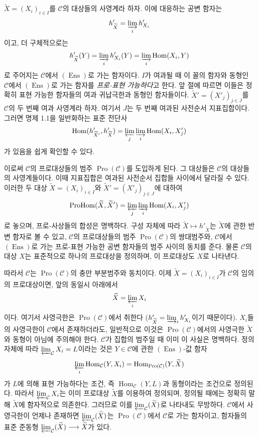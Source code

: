 $\widetilde X=(X_i)_{i\in I}$를 $\mathcal C$의 대상들의 사영계라 하자.
이에 대응하는 공변 함자는
\[
  h'_{\widetilde X}=\varinjlim_i h'_{X_i}
\]
이고, 더 구체적으로는
\[
  h'_{\widetilde X}(Y)=\varinjlim_i h'_{X_i}(Y)
  =\varinjlim_i\operatorname{Hom}(X_i,Y)
\]
로 주어지는 $\mathcal C$에서 $(\operatorname{Ens})$로 가는 함자이다.
$I$가 여과될 때 이 꼴의 함자와 동형인 $\mathcal C$에서
$(\operatorname{Ens})$로 가는 함자를 \emph{프로-표현 가능하다}고 한다.
앞 절에 따르면 이들은 정확히 표현 가능한 함자들의 여과 귀납극한과
동형인 함자들이다. $\widetilde X'=(X'_j)_{j\in J}$를 $\mathcal C$의 두
번째 여과 사영계라 하자. 여기서 $J$는 두 번째 여과된 사전순서
지표집합이다. 그러면 명제 1.1을 일반화하는 표준 전단사
\[
  \operatorname{Hom}(h'_{\widetilde X'},h'_{\widetilde X})
  =\varprojlim_j\varinjlim_i\operatorname{Hom}(X_i,X'_j)
\]
가 있음을 쉽게 확인할 수 있다.

이로써 $\mathcal C$의 프로대상들의 범주
$\operatorname{Pro}(\mathcal C)$를 도입하게 된다. 그 대상들은
$\mathcal C$의 대상들의 사영계들이다. 이때 지표집합은 여과된 사전순서
집합들 사이에서 달라질 수 있다. 이러한 두 대상
$\widetilde X=(X_i)_{i\in I}$와
$\widetilde X'=(X'_j)_{j\in J}$에 대하여
\[
  \operatorname{ProHom}(\widetilde X,\widetilde X')
  =\varprojlim_j\varinjlim_i\operatorname{Hom}(X_i,X'_j)
\]
로 놓으며, 프로-사상들의 합성은 명백하다. 구성 자체에 따라
$\widetilde X\longmapsto h'_{\widetilde X}$는 $\widetilde X$에 관한 반변
함자로 볼 수 있고, $\mathcal C$의 프로대상들의 범주
$\operatorname{Pro}(\mathcal C)$의 쌍대범주와, $\mathcal C$에서
$(\operatorname{Ens})$로 가는 프로-표현 가능한 공변 함자들의 범주 사이의
동치를 준다. 물론 $\mathcal C$의 대상 $X$는 표준적으로 하나의 프로대상을
정의하며, 이 프로대상도 $X$로 나타낸다.

따라서 $\mathcal C$는 $\operatorname{Pro}(\mathcal C)$의 충만 부분범주와
동치이다. 이제 $\widetilde X=(X_i)_{i\in I}$가 $\mathcal C$의 임의의
프로대상이면, 앞의 동일시 아래에서
\[
  \widetilde X=\varprojlim_i X_i
\]
이다. 여기서 사영극한은 $\operatorname{Pro}(\mathcal C)$에서 취한다
($h'_{\widetilde X}=\varinjlim_i h'_{X_i}$이기 때문이다). $X_i$들의
사영극한이 $\mathcal C$에서 존재하더라도, 일반적으로 이것은
$\operatorname{Pro}(\mathcal C)$에서의 사영극한 $\widetilde X$와 동형이
아님에 주의해야 한다. $\mathcal C$가 집합의 범주일 때 이미 이 사실은
명백하다. 정의 자체에 따라 $\varprojlim_{\mathcal C}X_i=L$이라는 것은
$Y\in\mathcal C$에 관한 $(\operatorname{Ens})$-값 함자
\[
  \varprojlim_i\operatorname{Hom}_{\mathcal C}(Y,X_i)
  =\operatorname{Hom}_{\operatorname{Pro}(\mathcal C)}(Y,\widetilde X)
\]
가 $L$에 의해 표현 가능하다는 조건, 즉
$\operatorname{Hom}_{\mathcal C}(Y,L)$과 동형이라는 조건으로 정의된다.
따라서 $\varprojlim_{\mathcal C}X_i$는 이미 프로대상 $\widetilde X$를
이용하여 정의되며, 정의될 때에는 정확히 말해 $\widetilde X$에
함자적으로 의존한다. 그러므로 이를
$\varprojlim_{\mathcal C}(\widetilde X)$로 나타내도 무방하다.
$\mathcal C$에서 사영극한이 언제나 존재하면
$\varprojlim_{\mathcal C}(\widetilde X)$는
$\operatorname{Pro}(\mathcal C)$에서 $\mathcal C$로 가는 함자이고,
함자들의 표준 준동형
$\varprojlim_{\mathcal C}(\widetilde X)\longrightarrow\widetilde X$가 있다.

